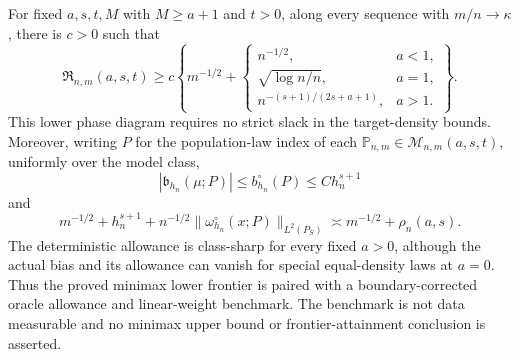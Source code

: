 For fixed \(a,s,t,M\) with \(M\ge a+1\) and \(t>0\), along every sequence with \(m/n\to\kappa\), there is \(c>0\) such that
\[
\mathfrak R_{n,m}(a,s,t)\ge c\left\{m^{-1/2}+\begin{cases}
n^{-1/2},&a<1,\\
\sqrt{\log n/n},&a=1,\\
n^{-(s+1)/(2s+a+1)},&a>1.
\end{cases}\right\}.
\]
This lower phase diagram requires no strict slack in the target-density bounds. Moreover, writing \(P\) for the population-law index of each \(\mathbb P_{n,m}\in\mathcal M_{n,m}(a,s,t)\), uniformly over the model class,
\[
|\mathfrak b_{h_n}(\mu;P)|\le b_{h_n}^{\circ}(P)\le C h_n^{s+1}
\]
and
\[
m^{-1/2}+h_n^{s+1}+n^{-1/2}\|\omega_{h_n}^{\circ}(x;P)\|_{L^2(P_S)}
\asymp m^{-1/2}+\rho_n(a,s).
\]
The deterministic allowance is class-sharp for every fixed \(a>0\), although the actual bias and its allowance can vanish for special equal-density laws at \(a=0\). Thus the proved minimax lower frontier is paired with a boundary-corrected oracle allowance and linear-weight benchmark. The benchmark is not data measurable and no minimax upper bound or frontier-attainment conclusion is asserted.
